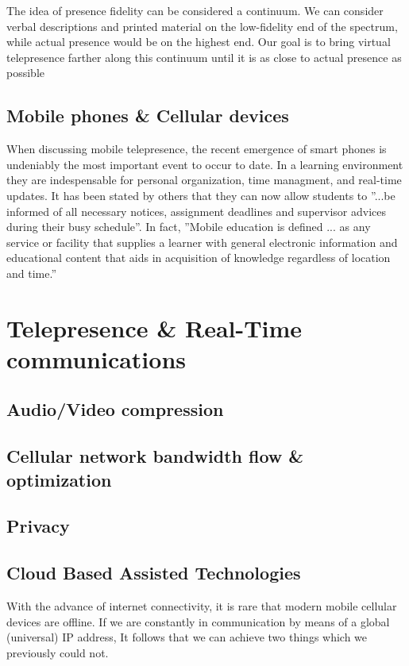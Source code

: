 \documentclass[a4paper,12pt]{report}
\begin{document}
The idea of presence fidelity can be considered a continuum. We can consider verbal descriptions and printed material on the low-fidelity end of the spectrum, while actual presence would be on the highest end. Our goal is to bring virtual telepresence farther along this continuum until it is as close to actual presence as possible \cite{726589}

\subsection{Mobile phones \& Cellular devices} When discussing mobile telepresence, the recent emergence of smart phones is undeniably the most important event to occur to date. In a learning environment they are indespensable for personal organization, time managment, and real-time updates. It has been stated by others that they can now allow students to ''...be informed of all necessary notices, assignment deadlines and supervisor advices during their busy schedule''. In fact, ''Mobile education is defined ... as any service or facility that supplies a learner with general electronic information and educational content that aids in acquisition of knowledge regardless of location and time.'' \cite{4469080}

\cite{6007847}
\section{Telepresence \& Real-Time communications}
\subsection{Audio/Video compression}
\cite{4297087}
\cite{4801602}
\cite{5054795}
\subsection{Cellular network bandwidth flow \& optimization}
\cite{5710522}
\cite{1300874}
\cite{1376696}
\subsection{Privacy}
\cite{4698190}
\cite{4471983}
\cite{6270872}
\cite{1032602}
\subsection{Cloud Based Assisted Technologies}

With the advance of internet connectivity, it is rare that modern mobile cellular devices are offline. If we are constantly in communication by means of a global (universal) IP address, It follows that we can achieve two things which we previously could not. 
\end{document}

